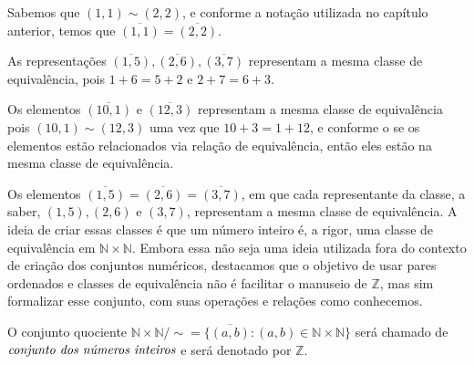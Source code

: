 \documentclass[../main.tex]{subfiles}
\begin{document}
\begin{ex}\label{int-ex-classesIguaisRepresentantesDiferentes}
    Sabemos que $(1,1) \sim (2,2)$, e conforme a notação utilizada no capítulo anterior, temos que $\overline{(1,1)} = \overline{(2,2)}$.
\end{ex}
\begin{ex}
    As representações $\overline{(1,5)}, \overline{(2,6)}, \overline{(3,7)}$ representam a mesma classe de equivalência, pois $1+6 = 5+2$ e $2+7=6+3$.
\end{ex}
\begin{ex}
    Os elementos $\overline{(10,1)}$ e $\overline{(12,3)}$ representam a mesma classe de equivalência pois $(10,1) \sim (12,3)$ uma vez que
    $10+3 = 1 + 12$, e conforme o  se os elementos estão relacionados via relação de equivalência, então eles estão na mesma classe de equivalência.
\end{ex}
\begin{ex}
    Os elementos $\overline{(1,5)} = \overline{(2,6)} = \overline{(3,7)}$, em que cada representante da classe, a saber, $(1,5), (2,6)$ e $(3,7)$, representam a mesma classe de equivalência. A ideia de criar essas classes é que um número inteiro é, a rigor, uma classe de equivalência em $\mathbb{N} \times \mathbb{N}$. Embora essa não seja uma ideia utilizada fora do contexto de criação dos conjuntos numéricos, destacamos que o objetivo de usar pares ordenados e classes de equivalência não é facilitar o manuseio de $\mathbb{Z}$, mas sim formalizar esse conjunto, com suas operações e relações como conhecemos.
\end{ex}

\begin{defi}\label{int-def-conjuntoZ}
    O conjunto quociente $\mathbb{N} \times \mathbb{N} / \sim = \{ \overline{(a,b)}: (a,b) \in \mathbb{N} \times \mathbb{N}\}$ será chamado de $\emph{conjunto dos números inteiros}$ e será denotado por $\mathbb{Z}$.
\end{defi}
\end{document}
